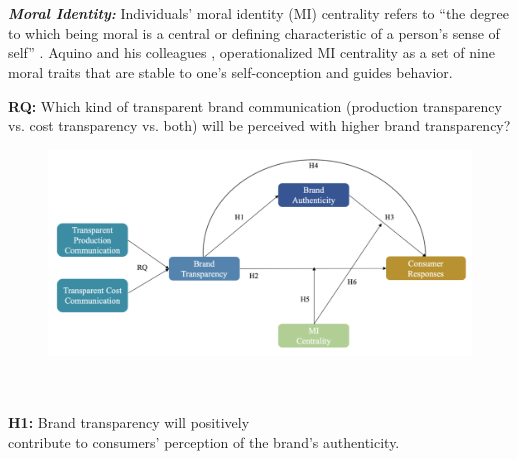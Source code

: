 \documentclass[a0,portrait]{a0poster}
\begin{document}
\begin{minipage}[c]{\linewidth}
\begin{framed}
\begin{multicols}{2}
\\ 
\\
    \color{Maroon} \textbf{\emph{Moral Identity:}} \color{Black}Individuals’ moral identity (MI) centrality refers to “the degree to which being moral is a central or defining characteristic of a person’s sense of self” \autocite{blasi_moral_1994}. Aquino and his colleagues \autocite{aquino_self-importance_2002}\autocite{aquino_testing_2009}, operationalized MI centrality as a set of nine moral traits that are stable to one’s self-conception and guides behavior. 
    \\
   \begin{center}
  \color{Maroon} \textbf{RQ:} \color{Black}  Which kind of transparent brand communication (production transparency vs. cost transparency vs. both) will be perceived with higher brand transparency? \\

  \end{center}
  
  \begin{figure}
\centering
\includegraphics[scale=1.3]{figures/Figure1}
\label{ALICerros}
\end{figure}
\\
\color{Maroon}
\textbf \\\textbf {H1:} \color{Black}Brand transparency will positively \\contribute to consumers' perception of the brand's authenticity. \\


\end{multicols}
\end{framed}
\end{minipage}
\end{document}
